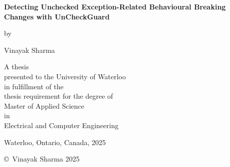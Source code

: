 \pagestyle{empty}

\begin{titlepage}
        \begin{center}
        \vspace*{1.0cm}

        \Huge
        {\bf Detecting Unchecked Exception-Related Behavioural Breaking Changes with UnCheckGuard }

        \vspace*{1.0cm}

        \normalsize
        by \\

        \vspace*{1.0cm}

        \Large
        Vinayak Sharma \\

        \vspace*{3.0cm}

        \normalsize
        A thesis \\
        presented to the University of Waterloo \\ 
        in fulfillment of the \\
        thesis requirement for the degree of \\
        Master of Applied Science \\
        in \\
        Electrical and Computer Engineering \\

        \vspace*{1.0cm}

        Waterloo, Ontario, Canada, 2025 \\

        \vspace*{1.0cm}

        \copyright\ Vinayak Sharma 2025 \\
        \end{center}
\end{titlepage}

\pagestyle{plain}
\setcounter{page}{2}


